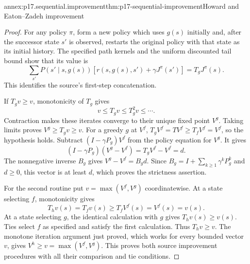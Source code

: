 \begin{annexitem}{annex:p17.sequential.improvement}{thm:p17-sequential-improvement}{Howard and Eaton--Zadeh improvement}
\begin{proof}
For any policy \(\pi\), form a new policy which
uses \(g(s)\) initially and, after the successor
state \(s'\) is observed, restarts the original
policy with that state as its initial history.
The specified path kernels and the uniform
discounted tail bound show that its value is
\[
          \sum_{s'}P(s'\mid s,g(s))
                          [r(s,g(s),s')+\gamma J^\pi(s')]
                                                    =T_gJ^\pi(s).
\]
This identifies the source's first-step concatenation.

If \(T_gv\geq v\), monotonicity of \(T_g\) gives
\[
                 v\leq T_gv\leq T_g^2v\leq\cdots .
\]
Contraction makes these iterates converge to
their unique fixed point \(V^g\). Taking limits
proves \(V^g\geq T_gv\geq v\).
For a greedy \(g\) at \(V^f\),
\(T_gV^f=TV^f\geq T_fV^f=V^f\),
so the hypothesis holds.
Subtract \((I-\gamma P_g)V^f\) from the
policy equation for \(V^g\). It gives
\[
                 (I-\gamma P_g)(V^g-V^f)
                              =T_gV^f-V^f=d.
\]
The nonnegative inverse \(B_g\) gives
\(V^g-V^f=B_gd\).
Since \(B_g=I+\sum_{k\geq1}\gamma^kP_g^k\)
and \(d\geq0\), this vector is at least \(d\),
which proves the strictness assertion.

For the second routine put \(v=\max(V^f,V^g)\)
coordinatewise. At a state selecting \(f\),
monotonicity gives
\[
             T_hv(s)=T_fv(s)\geq T_fV^f(s)
                                  =V^f(s)=v(s).
\]
At a state selecting \(g\), the identical
calculation with \(g\) gives \(T_hv(s)\geq v(s)\).
Ties select \(f\) as specified and satisfy the
first calculation. Thus \(T_hv\geq v\).
The monotone iteration argument just proved,
which works for every bounded vector \(v\),
gives \(V^h\geq v=\max(V^f,V^g)\).
This proves both source improvement procedures
with all their comparison and tie conditions.
\end{proof}
\end{annexitem}

